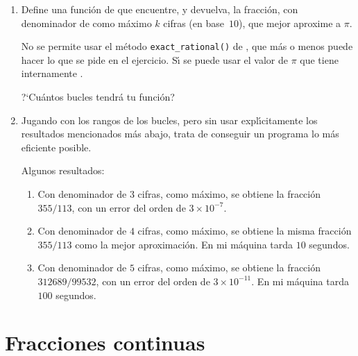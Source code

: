  \begin{ejer}
 
 \begin{enumerate}
 \item Define una funci\'on de {\sage}  que encuentre, y devuelva,  la
fracci\'on,
con denominador de como m\'aximo  $k$ cifras (en base~$10$), que mejor aproxime
a $\pi.$ 
 
 \footnotesize
 {\sc No se permite} usar el m\'etodo \lstinline|exact_rational()| de {\sage} ,
que
m\'as o menos puede hacer lo que se pide en el ejercicio. {\sc S\'{\i} se
puede} 
usar el valor de $\pi$ que tiene internamente {\sage}.
 
 ?`Cu\'antos bucles tendr\'a tu funci\'on?
 \normalsize
 
 \item Jugando con los rangos de los bucles, pero sin usar expl\'{\i}citamente
los resultados mencionados m\'as abajo,  trata de conseguir un programa lo m\'as
eficiente posible. 
 
 \footnotesize
 \bigskip
 {\sc Algunos resultados:}
 
 \begin{enumerate}
  \item Con denominador de $3$ cifras, como m\'aximo, se obtiene la fracci\'on
$355/113$, con un error del orden de $3\times 10^{-7}$. 

\item Con denominador de $4$ cifras, como m\'aximo, se obtiene la misma
fracci\'on $355/113$ como la mejor aproximaci\'on.  En mi m\'aquina tarda   $10$
segundos. 

\item Con denominador de $5$ cifras, como m\'aximo, se obtiene la fracci\'on
$312689/99532$, con un error del orden de $3\times 10^{-11}$. En mi m\'aquina 
tarda   $100$ segundos. 
 \end{enumerate}

\end{enumerate}
\end{ejer}



\section{Fracciones continuas} 

